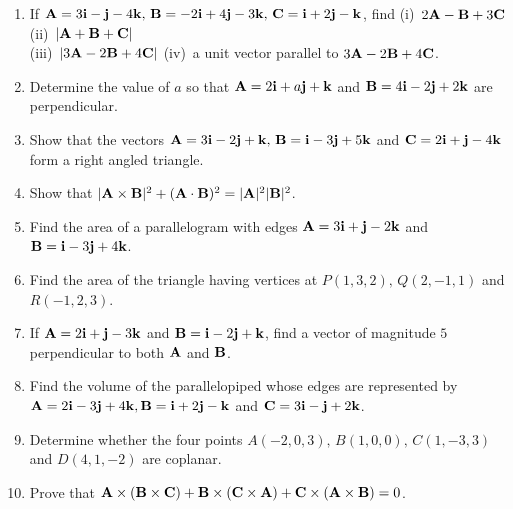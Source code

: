 \documentclass[titlepage,a4paper,12pt]{report}
\begin{document}
\begin{enumerate}
\item If ${\bf{A}}=3{\bf{i}}-{\bf{j}}-4{\bf{k}}, \, {\bf{B}}=-2{\bf{i}}+4{\bf{j}}-3{\bf{k}}, \, {\bf{C}}={\bf{i}}+2{\bf{j}}-{\bf{k}}$, find (i)\, $2{\bf{A}}-{\bf{B}}+3{\bf{C}}$ \quad (ii)\, $|{\bf{A}}+{\bf{B}}+{\bf{C}}|$\\
(iii)\, $|3{\bf{A}}-2{\bf{B}}+4{\bf{C}}|$ \quad (iv)\, a unit vector parallel to $3{\bf{A}}-2{\bf{B}}+4{\bf{C}}$.
\item Determine the value of $a$ so that ${\bf{A}}=2{\bf{i}}+a{\bf{j}}+{\bf{k}}$ and ${\bf{B}}=4{\bf{i}}-2{\bf{j}}+2{\bf{k}}$ are perpendicular.
\item Show that the vectors ${\bf{A}}=3{\bf{i}}-2{\bf{j}}+{\bf{k}}, \, {\bf{B}}={\bf{i}}-3{\bf{j}}+5{\bf{k}}$ and ${\bf{C}}=2{\bf{i}}+{\bf{j}}-4{\bf{k}}$ form a right angled triangle.
\item Show that $|{\bf{A} \times \bf{B}}|^2+ ({\bf{A}\cdot \bf{B}})^2=|{\bf{A}}|^2|{\bf{B}}|^2$.
\item Find the area of a parallelogram  with edges ${\bf{A}}=3{\bf{i}}+{\bf{j}}-2{\bf{k}}$ and ${\bf{B}}={\bf{i}}-3{\bf{j}}+4{\bf{k}}$.
\item Find the area of the triangle having vertices at $P(1,3,2), \, Q(2,-1,1)$ and $R(-1,2,3)$.
\item If ${\bf{A}}=2{\bf{i}}+{\bf{j}}-3{\bf{k}}$ and ${\bf{B}}={\bf{i}}-2{\bf{j}}+{\bf{k}}$, find a vector of magnitude $5$ perpendicular to both ${\bf{A}}$ and ${\bf{B}}$.
\item Find the volume of the parallelopiped whose edges are represented by ${\bf{A}}=2{\bf{i}}-3{\bf{j}}+4{\bf{k}}, \\ {\bf{B}}={\bf{i}}+2{\bf{j}}-{\bf{k}}$ and ${\bf{C}}=3{\bf{i}}-{\bf{j}}+2{\bf{k}}$.
\item Determine whether the four points $A(-2, 0, 3), \, B(1,0,0), \, C(1,-3,3)$ and $D(4,1,-2)$ are coplanar.
\item Prove that ${\bf{A}\times (\bf{B}\times \bf{C})}+{\bf{B}\times (\bf{C}\times \bf{A})}+{\bf{C}\times (\bf{A}\times \bf{B})}=0$.
\end{enumerate}
\end{document}
